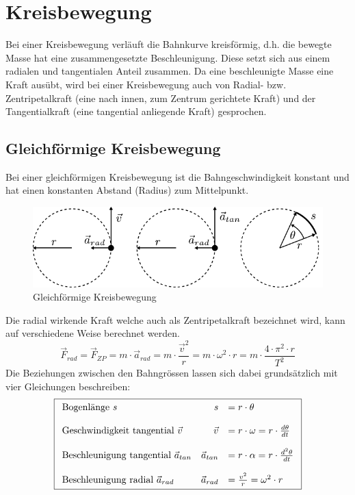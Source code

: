 \chapter{Kreisbewegung}
Bei einer Kreisbewegung verläuft die Bahnkurve kreisförmig,
d.h. die bewegte Masse hat eine zusammengesetzte Beschleunigung.
Diese setzt sich aus einem radialen und tangentialen Anteil 
zusammen. Da eine beschleunigte Masse eine Kraft ausübt, wird 
bei einer Kreisbewegung auch von Radial- bzw. Zentripetalkraft
(eine nach innen, zum Zentrum gerichtete Kraft) und der 
Tangentialkraft (eine tangential anliegende Kraft) gesprochen.

\newpage
\section{Gleichförmige Kreisbewegung}
Bei einer gleichförmigen Kreisbewegung ist die Bahngeschwindigkeit
konstant und hat einen konstanten Abstand (Radius) zum Mittelpunkt.

\begin{figure}[h!]
	\centering
	\includegraphics[scale=0.8]{kreisbewegung.pdf}
	\caption{Gleichförmige Kreisbewegung}
	\label{fig:kreisbewegung}
\end{figure}

\noindent
Die radial wirkende Kraft welche auch als Zentripetalkraft 
bezeichnet wird, kann auf verschiedene Weise berechnet werden.
\[ \boxed{\vec{F}_{rad} = \vec{F}_{ZP} 
	= m \cdot \vec{a}_{rad}
	= m \cdot \frac{\vec{v}^2}{r} 
	= m \cdot \omega^2 \cdot r 
	= m \cdot \frac{4 \cdot \pi^2 \cdot r}{T^2} } \]
Die Beziehungen zwischen den Bahngrössen lassen sich dabei 
grundsätzlich mit vier Gleichungen beschreiben:
\[ \boxed{ \begin{array}{l r l}
	\text{Bogenlänge $s$} & 
		s & = r \cdot \theta \\
	& & \\
	\text{Geschwindigkeit tangential $\vec{v}$} &
		\vec{v} & = r \cdot \omega
		= r \cdot \frac{d\theta}{dt} \\
	& & \\
	\text{Beschleunigung tangential $\vec{a}_{tan}$} &
		\vec{a}_{tan} & = r \cdot \alpha 
		= r \cdot \frac{d^2\theta}{dt} \\
	& & \\
	\text{Beschleunigung radial $\vec{a}_{rad}$} &
		\vec{a}_{rad} & = \frac{v^2}{r} = \omega^2 \cdot r
\end{array} }\]

